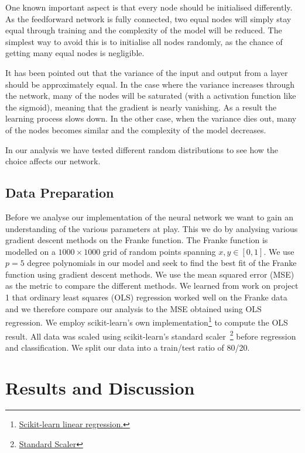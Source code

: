 \documentclass[a4paper, 
amsfonts, 
amssymb, 
amsmath, 
reprint, 
showkeys, 
nofootinbib, 
twoside]{revtex4-2}
\begin{document}
One known important aspect is that every node should be initialised differently. As the feedforward network is fully connected, two equal nodes will simply stay equal through training and the complexity of the model will be reduced. The simplest way to avoid this is to initialise all nodes randomly, as the chance of getting many equal nodes is negligible. 

It has been pointed out that the variance of the input and output from a layer should be approximately equal\cite{gb10}. In the case where the variance increases through the network, many of the nodes will be saturated (with a activation function like the sigmoid), meaning that the gradient is nearly vanishing. As a result the learning process slows down. In the other case, when the variance dies out, many of the nodes becomes similar and the complexity of the model decreases.

In our analysis we have tested different random distributions to see how the choice affects our network.

\subsection{Data Preparation}

Before we analyse our implementation of the neural network we want to gain an understanding of the various parameters at play. This we do by analysing various gradient descent methods on the Franke function. The Franke function is modelled on a $1000 \times 1000$ grid of random points spanning $x, y \in [0, 1]$.  We use $p = 5$ degree polynomials in our model and seek to find the best fit of the Franke function using gradient descent methods. We use the mean squared error (MSE) as the metric to compare the different methods. We learned from work on project 1 that ordinary least squares (OLS) regression worked well on the Franke data and we therefore compare our analysis to the MSE obtained using OLS regression. We employ scikit-learn's own implementation\footnote{\href{https://scikit-learn.org/stable/modules/generated/sklearn.linear_model.LinearRegression.html}{Scikit-learn linear regression.}} to compute the OLS result. All data was scaled using scikit-learn's standard scaler~\footnote{\href{https://scikit-learn.org/stable/modules/generated/sklearn.preprocessing.StandardScaler.html}{Standard Scaler}} before regression and classification. We split our data into a train/test ratio of 80/20.

\section{Results and Discussion}
\label{results}
\end{document}
